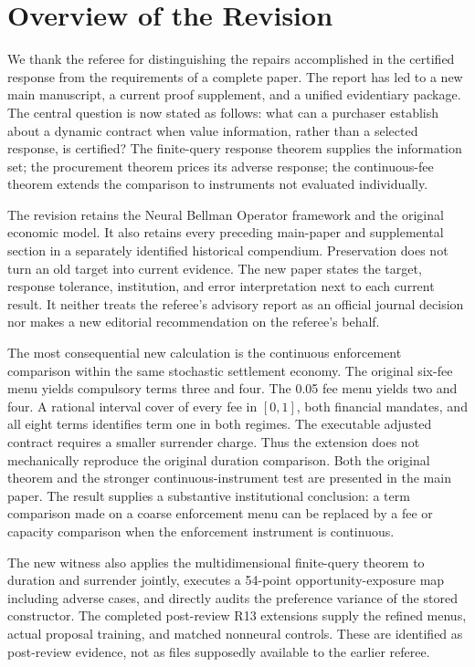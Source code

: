 \section{Overview of the Revision}
We thank the referee for distinguishing the repairs accomplished in the certified response from the requirements of a complete paper. The report has led to a new main manuscript, a current proof supplement, and a unified evidentiary package. The central question is now stated as follows: what can a purchaser establish about a dynamic contract when value information, rather than a selected response, is certified? The finite-query response theorem supplies the information set; the procurement theorem prices its adverse response; the continuous-fee theorem extends the comparison to instruments not evaluated individually.

The revision retains the Neural Bellman Operator framework and the original economic model. It also retains every preceding main-paper and supplemental section in a separately identified historical compendium. Preservation does not turn an old target into current evidence. The new paper states the target, response tolerance, institution, and error interpretation next to each current result. It neither treats the referee's advisory report as an official journal decision nor makes a new editorial recommendation on the referee's behalf.

The most consequential new calculation is the continuous enforcement comparison within the same stochastic settlement economy. The original six-fee menu yields compulsory terms three and four. The 0.05 fee menu yields two and four. A rational interval cover of every fee in $[0,1]$, both financial mandates, and all eight terms identifies term one in both regimes. The executable adjusted contract requires a smaller surrender charge. Thus the extension does not mechanically reproduce the original duration comparison. Both the original theorem and the stronger continuous-instrument test are presented in the main paper. The result supplies a substantive institutional conclusion: a term comparison made on a coarse enforcement menu can be replaced by a fee or capacity comparison when the enforcement instrument is continuous.

The new witness also applies the multidimensional finite-query theorem to duration and surrender jointly, executes a 54-point opportunity-exposure map including adverse cases, and directly audits the preference variance of the stored constructor. The completed post-review R13 extensions supply the refined menus, actual proposal training, and matched nonneural controls. These are identified as post-review evidence, not as files supposedly available to the earlier referee.


